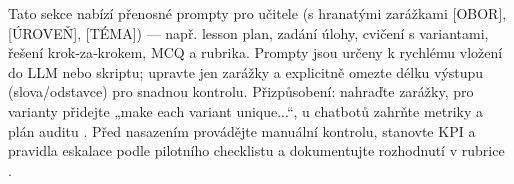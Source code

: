 Tato sekce nabízí přenosné prompty pro učitele (s hranatými zarážkami [OBOR], [ÚROVEŇ], [TÉMA]) — např. lesson plan, zadání úlohy, cvičení s variantami, řešení krok‑za‑krokem, MCQ a rubrika.  
Prompty jsou určeny k rychlému vložení do LLM nebo skriptu; upravte jen zarážky a explicitně omezte délku výstupu (slova/odstavce) pro snadnou kontrolu.  
Přizpůsobení: nahraďte zarážky, pro varianty přidejte „make each variant unique...“, u chatbotů zahrňte metriky a plán auditu \cite{2-5}.  
Před nasazením provádějte manuální kontrolu, stanovte KPI a pravidla eskalace podle pilotního checklistu a dokumentujte rozhodnutí v rubrice \cite{2-6}.